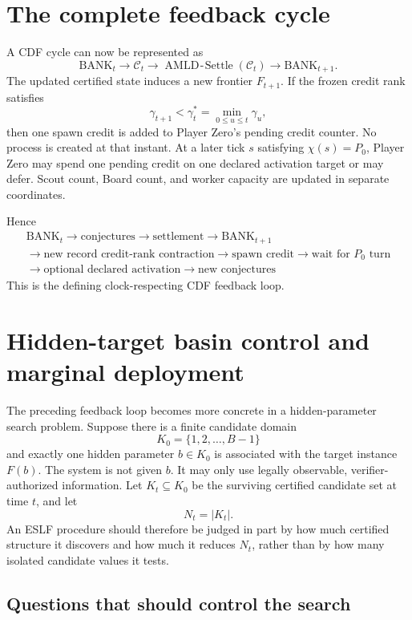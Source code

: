 \documentclass[11pt]{article}
\theoremstyle{definition}
\newcommand{\BANK}{\mathrm{BANK}}
\begin{document}
\section{The complete feedback cycle}

A CDF cycle can now be represented as
\[
\BANK_t\longrightarrow\mathcal C_t\longrightarrow\operatorname{AMLD\!\text{-}\!Settle}(\mathcal C_t)\longrightarrow\BANK_{t+1}.
\]
The updated certified state induces a new frontier $F_{t+1}$. If the frozen credit rank satisfies
\[
\gamma_{t+1}<\gamma_t^*=\min_{0\le u\le t}\gamma_u,
\]
then one spawn credit is added to Player Zero's pending credit counter. No process is created at that instant. At a later tick $s$ satisfying $\chi(s)=P_0$, Player Zero may spend one pending credit on one declared activation target or may defer. Scout count, Board count, and worker capacity are updated in separate coordinates.

Hence
\[
\boxed{\begin{gathered}
\BANK_t\to\text{conjectures}\to\text{settlement}\to\BANK_{t+1}\\
\to\text{new record credit-rank contraction}\to\text{spawn credit}\to\text{wait for }P_0\text{ turn}\\
\to\text{optional declared activation}\to\text{new conjectures}
\end{gathered}}
\]
This is the defining clock-respecting CDF feedback loop.


\section{Hidden-target basin control and marginal deployment}

The preceding feedback loop becomes more concrete in a hidden-parameter search problem. Suppose there is a finite candidate domain
\[
K_0=\{1,2,\ldots,B-1\}
\]
and exactly one hidden parameter $b\in K_0$ is associated with the target instance $F(b)$. The system is not given $b$. It may only use legally observable, verifier-authorized information. Let $K_t\subseteq K_0$ be the surviving certified candidate set at time $t$, and let
\[
N_t=|K_t|.
\]
An ESLF procedure should therefore be judged in part by how much certified structure it discovers and how much it reduces $N_t$, rather than by how many isolated candidate values it tests.

\subsection{Questions that should control the search}
\end{document}
